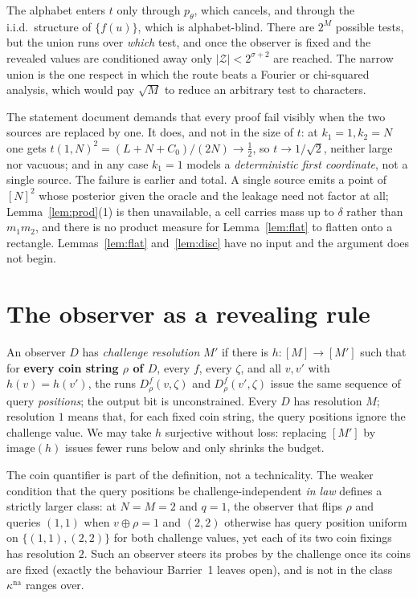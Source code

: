 \documentclass{aicr-solution}
\newcommand{\kna}{\kappa^{\mathrm{na}}}
\begin{document}
\begin{remark}\label{rem:one}
The alphabet enters $t$ only through $p_\theta$, which cancels, and through the
i.i.d.\ structure of $\{f(u)\}$, which is alphabet-blind. There are $2^{M}$
possible tests, but the union runs over \emph{which} test, and once the observer
is fixed and the revealed values are conditioned away only $|\mathcal Z|<2^{\sigma+2}$
are reached. The narrow union is the one respect in which the route beats a Fourier or
chi-squared analysis, which would pay $\sqrt M$ to reduce an arbitrary test to
characters.

The statement document demands that every proof fail visibly when the two sources
are replaced by one. It does, and not in the size of $t$: at $k_1=1,k_2=N$ one
gets $t(1,N)^{2}=(L+N+C_0)/(2N)\to\tfrac12$, so $t\to1/\sqrt2$, neither large nor
vacuous; and in any case $k_1=1$ models a \emph{deterministic first
coordinate}, not a single source. The failure is earlier and total. A single
source emits a point of $[N]^{2}$ whose posterior given the oracle and the
leakage need not factor at all; Lemma~\ref{lem:prod}(1) is then unavailable, a
cell carries mass up to $\delta$ rather than $m_1m_2$, and there is no product
measure for Lemma~\ref{lem:flat} to flatten onto a rectangle. Lemmas~\ref{lem:flat}
and~\ref{lem:disc} have no input and the argument does not begin.
\end{remark}

\section{The observer as a revealing rule}

\begin{definition}\label{def:res}
An observer $D$ has \emph{challenge resolution $M'$} if there is $h:[M]\to[M']$ such that for
\textbf{every coin string $\rho$ of $D$}, every $f$, every $\zeta$, and all
$v,v'$ with $h(v)=h(v')$, the runs $D^{f}_{\rho}(v,\zeta)$ and
$D^{f}_{\rho}(v',\zeta)$ issue the same sequence of query \emph{positions}; the
output bit is unconstrained. Every $D$ has resolution $M$; resolution $1$ means
that, for each fixed coin string, the query positions ignore the challenge value.
We may take $h$ surjective without loss: replacing $[M']$ by $\mathrm{image}(h)$
issues fewer runs below and only shrinks the budget.
\end{definition}

The coin quantifier is part of the definition, not a technicality. The weaker
condition that the query positions be challenge-independent \emph{in law} defines
a strictly larger class: at $N=M=2$ and $q=1$, the observer that flips $\rho$ and
queries $(1,1)$ when $v\oplus\rho=1$ and $(2,2)$ otherwise has query position
uniform on $\{(1,1),(2,2)\}$ for both challenge values, yet each of its two coin
fixings has resolution $2$. Such an observer steers its probes by the challenge
once its coins are fixed (exactly the behaviour Barrier~1 leaves open), and
is not in the class $\kna$ ranges over.
\end{document}
